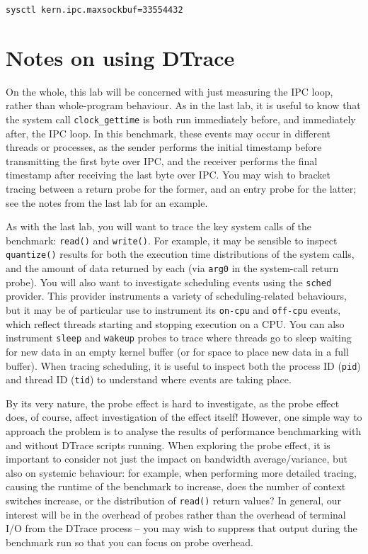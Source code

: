 \documentclass[a4paper,10pt]{article}
\begin{document}
\begin{verbatim}
sysctl kern.ipc.maxsockbuf=33554432
\end{verbatim}

\section*{Notes on using DTrace}

On the whole, this lab will be concerned with just measuring the IPC loop,
rather than whole-program behaviour.
As in the last lab, it is useful to know that the system call
\texttt{clock\_gettime} is both run immediately before, and immediately after,
the IPC loop.
In this benchmark, these events may occur in different threads or processes,
as the sender performs the initial timestamp before transmitting the first
byte over IPC, and the receiver performs the final timestamp after receiving
the last byte over IPC.
You may wish to bracket tracing between a return probe for the former, and an
entry probe for the latter; see the notes from the last lab for an example.

As with the last lab, you will want to trace the key system calls of the
benchmark: \texttt{read()} and \texttt{write()}.
For example, it may be sensible to inspect \texttt{quantize()} results for
both the execution time distributions of the system calls, and the amount of
data returned by each (via \texttt{arg0} in the system-call return probe).
You will also want to investigate scheduling events using the \texttt{sched}
provider.
This provider instruments a variety of scheduling-related behaviours, but it
may be of particular use to instrument its \texttt{on-cpu} and
\texttt{off-cpu} events, which reflect threads starting and stopping
execution on a CPU.
You can also instrument \texttt{sleep} and \texttt{wakeup} probes to trace
where threads go to sleep waiting for new data in an empty kernel buffer (or
for space to place new data in a full buffer).
When tracing scheduling, it is useful to inspect both the process ID
(\texttt{pid}) and thread ID (\texttt{tid}) to understand where events are
taking place.

By its very nature, the probe effect is hard to investigate, as the probe
effect does, of course, affect investigation of the effect itself!
However, one simple way to approach the problem is to analyse the results of
performance benchmarking with and without DTrace scripts running.
When exploring the probe effect, it is important to consider not just the
impact on bandwidth average/variance, but also on systemic behaviour: for
example, when performing more detailed tracing, causing the runtime of the
benchmark to increase, does the number of context switches increase, or the
distribution of \texttt{read()} return values?
In general, our interest will be in the overhead of probes rather than the
overhead of terminal I/O from the DTrace process -- you may wish to suppress
that output during the benchmark run so that you can focus on probe overhead.
\end{document}
